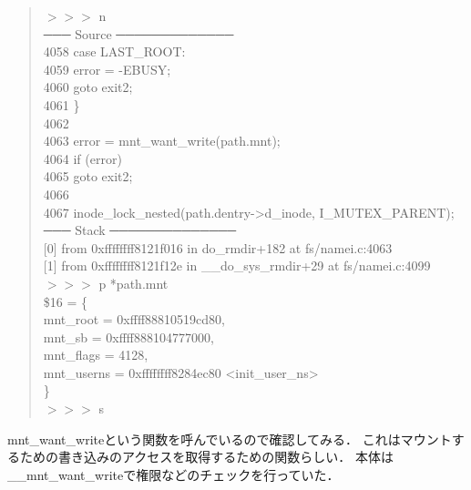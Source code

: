 \begin{quote}
$>>>$ n \\
─── Source ─────────────
\\
 4058      case LAST\_ROOT: \\
 4059          error = -EBUSY; \\
 4060          goto exit2; \\
 4061      \} \\
 4062 \\
 4063      error = mnt\_want\_write(path.mnt); \\
 4064      if (error) \\
 4065          goto exit2; \\
 4066 \\
 4067      inode\_lock\_nested(path.dentry->d\_inode, I\_MUTEX\_PARENT); \\
─── Stack ──────────────
\\
{[0]} from 0xffffffff8121f016 in do\_rmdir+182 at fs/namei.c:4063 \\
{[1]} from 0xffffffff8121f12e in \_\_do\_sys\_rmdir+29 at fs/namei.c:4099 \\
$>>>$ p *path.mnt \\
\$16 = \{ \\
  mnt\_root = 0xffff88810519cd80, \\
  mnt\_sb = 0xffff888104777000, \\
  mnt\_flags = 4128, \\
  mnt\_userns = 0xffffffff8284ec80 <init\_user\_ns> \\
\} \\
$>>>$ s
\end{quote}

mnt\_want\_writeという関数を呼んでいるので確認してみる．
これはマウントするための書き込みのアクセスを取得するための関数らしい．
本体は\_\_mnt\_want\_writeで権限などのチェックを行っていた．

